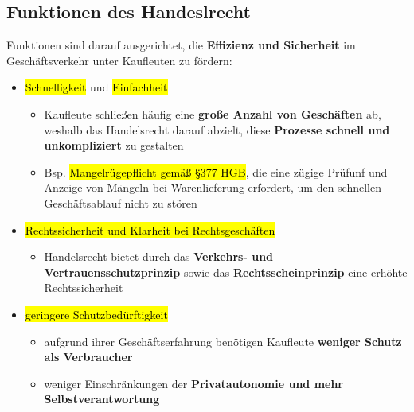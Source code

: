 \documentclass[a4paper, 10pt]{article}
\begin{document}
\subsection{Funktionen des Handeslrecht}
Funktionen sind darauf ausgerichtet, die \textbf{Effizienz und Sicherheit} im Geschäftsverkehr unter Kaufleuten zu fördern:
\begin{itemize}
    \item \hl{Schnelligkeit} und \hl{Einfachheit}
    \begin{itemize}
        \item Kaufleute schließen häufig eine \textbf{große Anzahl von Geschäften} ab, weshalb das Handelsrecht darauf abzielt, diese \textbf{Prozesse schnell und unkompliziert} zu gestalten
        \item Bsp. \hl{Mangelrügepflicht gemäß §377 HGB}, die eine zügige Prüfunf und Anzeige von Mängeln bei Warenlieferung erfordert, um den schnellen Geschäftsablauf nicht zu stören
    \end{itemize}

    \item \hl{Rechtssicherheit und Klarheit bei Rechtsgeschäften}
    \begin{itemize}
        \item Handelsrecht bietet durch das \textbf{Verkehrs- und Vertrauensschutzprinzip} sowie das \textbf{Rechtsscheinprinzip} eine erhöhte Rechtssicherheit
    \end{itemize}

    \item \hl{geringere Schutzbedürftigkeit}
    \begin{itemize}
        \item aufgrund ihrer Geschäftserfahrung benötigen Kaufleute \textbf{weniger Schutz als Verbraucher}
        \item weniger Einschränkungen der \textbf{Privatautonomie und mehr Selbstverantwortung}
    \end{itemize}
\end{itemize}
\end{document}
